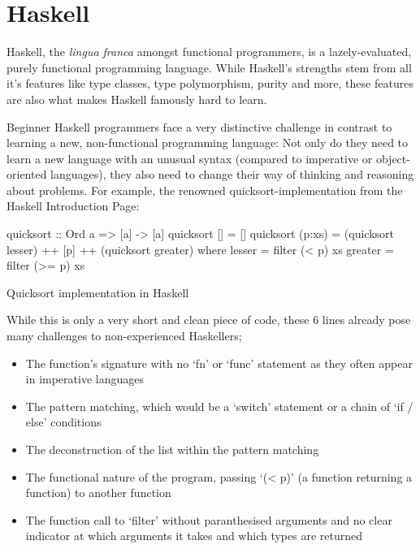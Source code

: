 \section{Haskell}

Haskell, the \textit{lingua franca} amongst functional programmers, is a lazely-evaluated, purely functional programming
language. While Haskell's strengths stem from all it's features like type classes, type polymorphism, purity and more,
these features are also what makes Haskell famously hard to learn\autocite{haskell-hard-one}\autocite{haskell-hard-two}\autocite{haskell-hard-three}\autocite{haskell-hard-four}.

Beginner Haskell programmers face a very distinctive challenge in contrast to learning a new, non-functional programming language:
Not only do they need to learn a new language with an unusual syntax (compared to imperative or object-oriented languages), they
also need to change their way of thinking and reasoning about problems.
For example, the renowned quicksort-implementation from the Haskell Introduction Page\autocite{haskell-quicksort}:

\begin{listing}
\begin{haskellcode}
quicksort :: Ord a => [a] -> [a]
quicksort []     = []
quicksort (p:xs) = (quicksort lesser) ++ [p] ++ (quicksort greater)
    where
        lesser  = filter (< p) xs
        greater = filter (>= p) xs
\end{haskellcode}
	\caption{Quicksort implementation in Haskell}\label{code:haskell-quicksort}
\end{listing}

While this is only a very short and clean piece of code, these 6 lines already pose many challenges to non-experienced Haskellers;

\begin{itemize}
    \item The function's signature with no `fn' or `func' statement as they often appear in imperative languages
    \item The pattern matching, which would be a `switch' statement or a chain of `if / else' conditions
    \item The deconstruction of the list within the pattern matching
    \item The functional nature of the program, passing `(< p)' (a function returning a function) to another function
    \item The function call to `filter' without paranthesised arguments and no clear indicator at which arguments
        it takes and which types are returned
\end{itemize}


